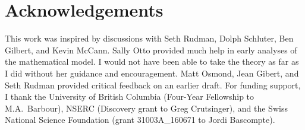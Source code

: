 \documentclass[11pt,]{article}
\begin{document}
\section{Acknowledgements}\label{acknowledgements}

This work was inspired by discussions with Seth Rudman, Dolph Schluter,
Ben Gilbert, and Kevin McCann. Sally Otto provided much help in early
analyses of the mathematical model. I would not have been able to take
the theory as far as I did without her guidance and encouragement. Matt
Osmond, Jean Gibert, and Seth Rudman provided critical feedback on an
earlier draft. For funding support, I thank the University of British
Columbia (Four-Year Fellowship to M.A.~Barbour), NSERC (Discovery grant
to Greg Crutsinger), and the Swiss National Science Foundation (grant
31003A\_160671 to Jordi Bascompte).


\end{document}
